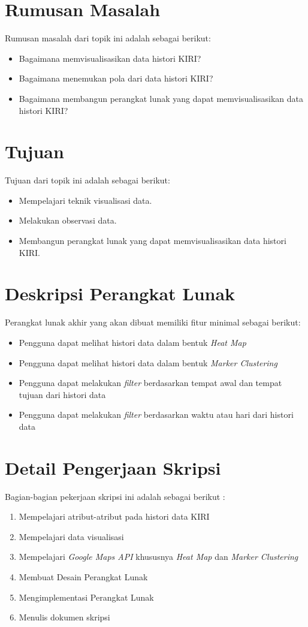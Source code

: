 \documentclass[a4paper,twoside]{article}
\begin{document}
\section{Rumusan Masalah}
Rumusan masalah dari topik ini adalah sebagai berikut:
\begin{itemize}
  \item Bagaimana memvisualisasikan data histori KIRI?
  \item Bagaimana menemukan pola dari data histori KIRI?
  \item Bagaimana membangun perangkat lunak yang dapat memvisualisasikan data histori KIRI?

\end{itemize}

\section{Tujuan}
Tujuan dari topik ini adalah sebagai berikut:
\begin{itemize}
  \item Mempelajari teknik visualisasi data.
  \item Melakukan observasi data.
  \item Membangun perangkat lunak yang dapat memvisualisasikan data histori KIRI.

\end{itemize}


 \newpage \section{Deskripsi Perangkat Lunak}
Perangkat lunak akhir yang akan dibuat memiliki fitur minimal sebagai berikut:
\begin{itemize}
	\item Pengguna dapat melihat histori data dalam bentuk \textit{Heat Map} 
	\item Pengguna dapat melihat histori data dalam bentuk \textit{Marker Clustering} 
	\item Pengguna dapat melakukan \textit{filter} berdasarkan tempat awal dan tempat tujuan  dari histori data
	\item Pengguna dapat melakukan \textit{filter} berdasarkan waktu atau hari  dari histori data
\end{itemize}

\section{Detail Pengerjaan Skripsi}
Bagian-bagian pekerjaan skripsi ini adalah sebagai berikut :
	\begin{enumerate}
		\item Mempelajari atribut-atribut pada histori data KIRI
		\item Mempelajari data visualisasi
		\item Mempelajari \textit{Google Maps API } khususnya \textit{Heat Map} dan \textit{Marker Clustering}
		\item Membuat Desain Perangkat Lunak
		\item Mengimplementasi Perangkat Lunak
		\item Menulis dokumen skripsi
	\end{enumerate}
\end{document}
